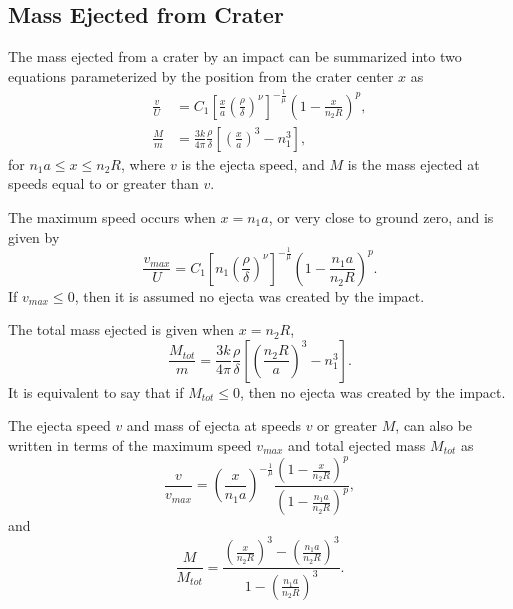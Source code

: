 \documentclass{article}
\begin{document}
\subsection{Mass Ejected from Crater}\label{ssec:Mass Ejected from Crater}

The mass ejected from a crater by an impact can be summarized into two equations parameterized by the position from the crater center $x$ as
\begin{align}\label{eq:v/U}
\frac{v}{U} &= C_1\left[\frac{x}{a}\left(\frac{\rho}{\delta}\right)^\nu\right]^{-\frac{1}{\mu}}\left(1 - \frac{x}{n_2 R}\right)^p,\\
\frac{M}{m} &= \frac{3k}{4\pi}\frac{\rho}{\delta}\left[\left(\frac{x}{a}\right)^3-n_1^3\right],\label{eq:M_HH11}
\end{align}
for $n_1 a \le x \le n_2 R$, where $v$ is the ejecta speed, and $M$ is the mass ejected at speeds equal to or greater than $v$.

The maximum speed occurs when $x = n_1 a$, or very close to ground zero, and is given by
\begin{equation}\label{eq:vmax}
\frac{v_{max}}{U} = C_1\left[n_1\left(\frac{\rho}{\delta}\right)^\nu\right]^{-\frac{1}{\mu}}\left(1 - \frac{n_1 a}{n_2 R}\right)^p.
\end{equation}
If $v_{max} \le 0$, then it is assumed no ejecta was created by the impact.

The total mass ejected is given when $x = n_2 R$,
\begin{equation}\label{eq:Mtot}
\frac{M_{tot}}{m} = \frac{3k}{4\pi}\frac{\rho}{\delta}\left[\left(\frac{n_2 R}{a}\right)^3-n_1^3\right].
\end{equation}
It is equivalent to say that if $M_{tot} \le 0$, then no ejecta was created by the impact.

The ejecta speed $v$ and mass of ejecta at speeds $v$ or greater $M$, can also be written in terms of the maximum speed $v_{max}$ and total ejected mass $M_{tot}$ as
\begin{equation}\label{eq:v/v_max}
\frac{v}{v_{max}} = \left(\frac{x}{n_1 a}\right)^{-\frac{1}{\mu}}\frac{\left(1-\frac{x}{n_2 R}\right)^p}{\left(1-\frac{n_1 a}{n_2 R}\right)^p},
\end{equation}
and
\begin{equation}\label{M/M_tot}
\frac{M}{M_{tot}} = \frac{\left(\frac{x}{n_2 R}\right)^3 - \left(\frac{n_1 a}{n_2 R}\right)^3}{1 - \left(\frac{n_1 a}{n_2 R}\right)^3}.
\end{equation}
\end{document}
